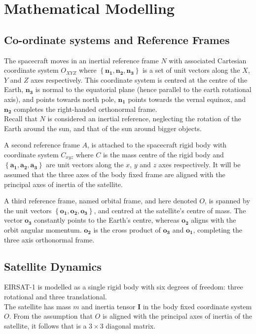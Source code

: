 
\section{Mathematical Modelling}
\subsection{Co-ordinate systems and Reference Frames}

The spacecraft moves in an inertial reference frame $N$ with associated Cartesian coordinate system $O_{XYZ}$ where $\left\{ \mathbf{n_1}, \mathbf{n_2}, \mathbf{n_3} \right\}$ is a set of unit vectors along the $X$, $Y$ and $Z$ axes respectively. This coordinate system is centred at the centre of the Earth, $\mathbf{n_3}$ is normal to the equatorial plane (hence parallel to the earth rotational axis), and points towards north pole, $\mathbf{n_1}$ points towards the vernal equinox, and $\mathbf{n_2}$ completes the right-handed orthonormal frame.\\
Recall that $N$ is considered an inertial reference, neglecting the rotation of the Earth around the sun, and that of the sun around bigger objects.

A second reference frame $A$, is attached to the spacecraft rigid body with coordinate system $C_{xyz}$ where $C$ is the mass centre of the rigid body and $ \left\{\mathbf{a_1}, \mathbf{a_2}, \mathbf{a_3} \right\}$ are unit vectors along the $x$, $y$ and $z$ axes respectively. It will be assumed that the three axes of the body fixed frame are aligned with the principal axes of inertia of the satellite. 

A third reference frame, named orbital frame, and here denoted $O$, is spanned by the unit vectors $\left\{\mathbf{o_1}, \mathbf{o_2}, \mathbf{o_3} \right\}$, and centred at the satellite's centre of mass. The vector $\mathbf{o_3}$ constantly points to the Earth's centre, whereas $\mathbf{o_2}$ aligns with the orbit angular momentum. $\mathbf{o_2}$ is the cross product of $\mathbf{o_3}$ and $\mathbf{o_1}$, completing the three axis orthonormal frame.

\subsection{Satellite Dynamics}

EIRSAT-1 is modelled as a single rigid body with six degrees of freedom: three rotational and three translational.\\
The satellite has mass $m$ and inertia tensor $\mathbf{I}$ in the body fixed coordinate system $O$. From the assumption that $O$ is aligned with the principal axes of inertia of the satellite, it follows that is a $3\times 3$ diagonal matrix.


